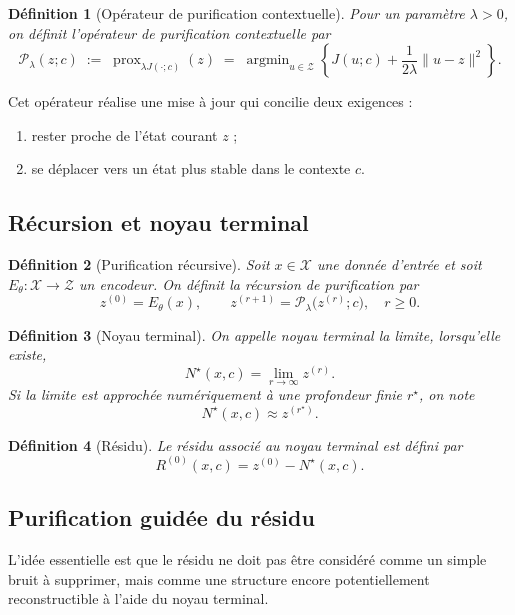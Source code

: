 \documentclass[11pt,a4paper]{article}
\newtheorem{definition}{Définition}[section]
\DeclareMathOperator{\prox}{prox}
\DeclareMathOperator{\argmin}{argmin}
\newcommand{\X}{\mathcal X}
\newcommand{\Z}{\mathcal Z}
\newcommand{\Pcal}{\mathcal P}
\newcommand{\1}{\mathbf 1}
\begin{document}
\begin{definition}[Opérateur de purification contextuelle]
Pour un paramètre \(\lambda>0\), on définit l'opérateur de purification contextuelle par
\[
\Pcal_\lambda(z;c)
\;:=\;
\prox_{\lambda J(\cdot;c)}(z)
\;=\;
\argmin_{u\in\Z}
\left\{
J(u;c)
+
\frac{1}{2\lambda}\|u-z\|^2
\right\}.
\]
\end{definition}

Cet opérateur réalise une mise à jour qui concilie deux exigences :
\begin{enumerate}[leftmargin=2em]
    \item rester proche de l'état courant \(z\) ;
    \item se déplacer vers un état plus stable dans le contexte \(c\).
\end{enumerate}

\subsection{Récursion et noyau terminal}

\begin{definition}[Purification récursive]
Soit \(x\in\X\) une donnée d'entrée et soit \(E_\theta:\X\to\Z\) un encodeur.
On définit la récursion de purification par
\[
z^{(0)} = E_\theta(x),
\qquad
z^{(r+1)} = \Pcal_\lambda\!\bigl(z^{(r)};c\bigr),
\quad r\ge 0.
\]
\end{definition}

\begin{definition}[Noyau terminal]
On appelle \emph{noyau terminal} la limite, lorsqu'elle existe,
\[
N^\star(x,c) = \lim_{r\to\infty} z^{(r)}.
\]
Si la limite est approchée numériquement à une profondeur finie \(r^\star\), on note
\[
N^\star(x,c) \approx z^{(r^\star)}.
\]
\end{definition}

\begin{definition}[Résidu]
Le résidu associé au noyau terminal est défini par
\[
R^{(0)}(x,c) = z^{(0)} - N^\star(x,c).
\]
\end{definition}

\subsection{Purification guidée du résidu}

L'idée essentielle est que le résidu ne doit pas être considéré comme un simple bruit à supprimer, mais comme une structure encore potentiellement reconstructible à l'aide du noyau terminal.
\end{document}
